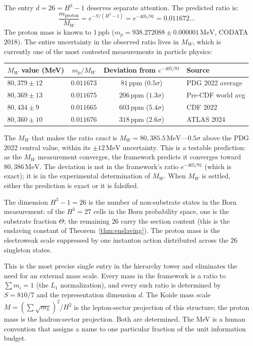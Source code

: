 \documentclass[11pt,a4paper]{article}
\theoremstyle{definition}
\theoremstyle{remark}
\begin{document}
The entry $d=26=H^3-1$ deserves separate attention. The predicted ratio is:
\begin{equation}\label{eq:protonW}
\frac{m_{\mathrm{proton}}}{M_W}=e^{-S/(H^3-1)}=e^{-405/91}=0.011672\ldots
\end{equation}
The proton mass is known to $1\,\mathrm{ppb}$ ($m_p = 938.272088 \pm 0.000001\,\mathrm{MeV}$, CODATA 2018). The entire uncertainty in the observed ratio lives in $M_W$, which is currently one of the most contested measurements in particle physics:

\begin{center}
\begin{tabular}{lccl}
\toprule
$M_W$ value (MeV) & $m_p/M_W$ & Deviation from $e^{-405/91}$ & Source \\
\midrule
$80{,}379 \pm 12$ & $0.011673$ & $81\,\mathrm{ppm}$ ($0.5\sigma$) & PDG 2022 average \\
$80{,}369 \pm 13$ & $0.011675$ & $206\,\mathrm{ppm}$ ($1.3\sigma$) & Pre-CDF world avg \\
$80{,}434 \pm 9$ & $0.011665$ & $603\,\mathrm{ppm}$ ($5.4\sigma$) & CDF 2022 \\
$80{,}360 \pm 10$ & $0.011676$ & $318\,\mathrm{ppm}$ ($2.6\sigma$) & ATLAS 2024 \\
\bottomrule
\end{tabular}
\end{center}

The $M_W$ that makes the ratio \emph{exact} is $M_W = 80{,}385.5\,\mathrm{MeV}$---$0.5\sigma$ above the PDG 2022 central value, within its $\pm 12\,\mathrm{MeV}$ uncertainty. This is a testable prediction: as the $M_W$ measurement converges, the framework predicts it converges toward $80{,}386\,\mathrm{MeV}$. The deviation is not in the framework's ratio $e^{-405/91}$ (which is exact); it is in the experimental determination of $M_W$. When $M_W$ is settled, either the prediction is exact or it is falsified.

The dimension $H^3-1=26$ is the number of non-substrate states in the Born measurement: of the $H^3=27$ cells in the Born probability space, one is the substrate fraction $\Theta$; the remaining $26$ carry the section content (this is the enslaving constant of Theorem~\ref{thm:enslaving}). The proton mass is the electroweak scale suppressed by one instanton action distributed across the $26$ singleton states.

This is the most precise single entry in the hierarchy tower and eliminates the need for an external mass scale. Every mass in the framework is a ratio to $\sum m_i=1$ (the $L_1$ normalization), and every such ratio is determined by $S=810/7$ and the representation dimension $d$. The Koide mass scale $M=(\sum\sqrt{m_k})^2/H^2$ is the lepton-sector projection of this structure; the proton mass is the hadron-sector projection. Both are determined. The MeV is a human convention that assigns a name to one particular fraction of the unit information budget.
\end{document}
